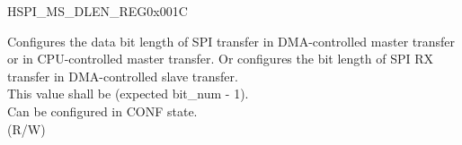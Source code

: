 \begin{register}{H}{SPI\_MS\_DLEN\_REG}{0x001C}\label{regdesc:SPIMSDLENREG}
%
%
\regnewline%
\begin{regdesc}\begin{reglist}
\label{fielddesc:SPIMSDATABITLEN}\item [SPI\_MS\_DATA\_BITLEN] Configures the data bit length of SPI transfer in DMA-controlled master transfer or in CPU-controlled master transfer. Or configures the bit length of SPI RX transfer in DMA-controlled slave transfer. \\
This value shall be (expected bit\_num - 1). \\ Can be configured in CONF state. \\ (R/W)
\end{reglist}\end{regdesc}
\end{register}


